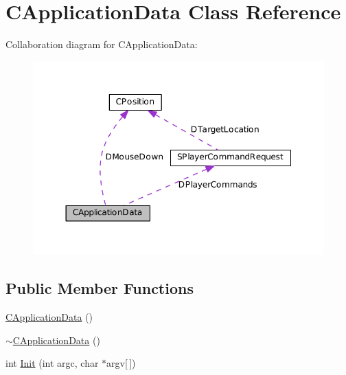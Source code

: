 \hypertarget{classCApplicationData}{}\section{C\+Application\+Data Class Reference}
\label{classCApplicationData}


Collaboration diagram for C\+Application\+Data\+:
\nopagebreak
\begin{figure}[H]
\begin{center}
\leavevmode
\includegraphics[width=350pt]{classCApplicationData__coll__graph}
\end{center}
\end{figure}
\subsection*{Public Member Functions}
\begin{DoxyCompactItemize}
\item 
\hyperlink{classCApplicationData_a3d496acbdfac67ca25ee028d0703c492}{C\+Application\+Data} ()
\item 
\hyperlink{classCApplicationData_ada8893519d385d721320c9dea0fc7001}{$\sim$\+C\+Application\+Data} ()
\item 
int \hyperlink{classCApplicationData_ab757e7ad037decb18cefa3f4ad2e1298}{Init} (int argc, char $\ast$argv\mbox{[}$\,$\mbox{]})
\end{DoxyCompactItemize}
